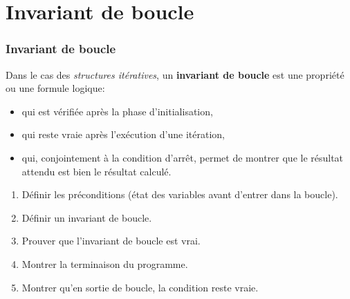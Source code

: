 \section{Invariant de boucle} 


\begin{frame}[fragile]
\frametitle{Invariant de boucle}

\begin{defi}
Dans le cas des \textit{structures itératives}, un \textbf{invariant de boucle} est une propriété ou une formule logique:
\begin{itemize}
 \item qui est vérifiée après la phase d'initialisation,
 \item qui reste vraie après l'exécution d'une itération,
 \item qui, conjointement à la condition d'arrêt, permet de montrer que le résultat attendu est bien le résultat calculé.
\end{itemize}
\end{defi}

\begin{enumerate}
 \item Définir les préconditions (état des variables avant d'entrer dans la boucle).
 \item Définir un invariant de boucle.
 \item Prouver que l'invariant de boucle est vrai.
 \item Montrer la terminaison du programme.
 \item Montrer qu'en sortie de boucle, la condition reste vraie.
\end{enumerate}
\end{frame}


